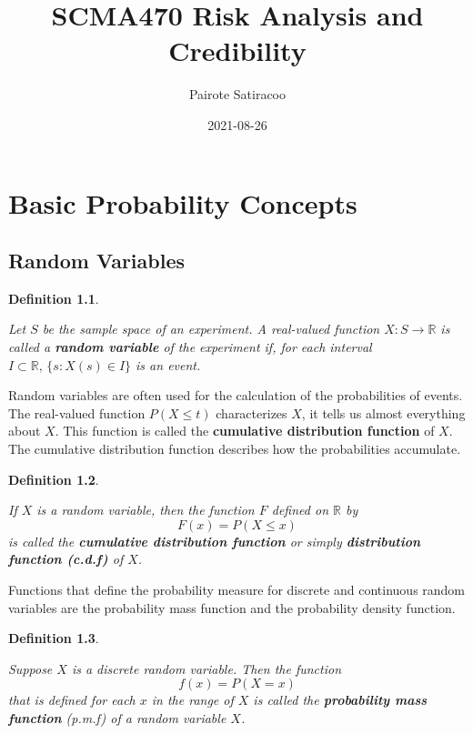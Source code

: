 \documentclass[
]{book}
\title{SCMA470 Risk Analysis and Credibility}
\author{Pairote Satiracoo}
\date{2021-08-26}
\theoremstyle{definition}
\newtheorem{definition}{Definition}[chapter]
\theoremstyle{definition}
\theoremstyle{definition}
\theoremstyle{definition}
\theoremstyle{remark}
\begin{document}
\maketitle

{
\setcounter{tocdepth}{1}
\tableofcontents
}
\hypertarget{basic-probability-concepts}{%
\chapter{Basic Probability Concepts}\label{basic-probability-concepts}}

\hypertarget{random-variables}{%
\section{Random Variables}\label{random-variables}}

\begin{definition}
\protect\hypertarget{def:unlabeled-div-1}{}\label{def:unlabeled-div-1}

\emph{Let \(S\) be the sample space of an experiment. A
real-valued function \(X : S \rightarrow \mathbb{R}\) is called a \textbf{random
variable} of the experiment if, for each interval
\(I \subset \mathbb{R}, \, \{s : X(s) \in I \}\) is an event. }

\end{definition}

Random variables are often used for the calculation of the probabilities
of events. The real-valued function \(P(X \le t)\) characterizes \(X\), it
tells us almost everything about \(X\). This function is called the
\textbf{cumulative distribution function} of \(X\). The cumulative distribution
function describes how the probabilities accumulate.

\begin{definition}
\protect\hypertarget{def:unlabeled-div-2}{}\label{def:unlabeled-div-2}

\emph{If \(X\) is a random variable, then the function \(F\)
defined on \(\mathbb{R}\) by \[F(x) = P(X \le x)\] is called the
\textbf{cumulative distribution function} or simply \textbf{distribution function
(c.d.f)} of \(X\).}

\end{definition}

Functions that define the probability measure for discrete and
continuous random variables are the probability mass function and the
probability density function.

\begin{definition}
\protect\hypertarget{def:unlabeled-div-3}{}\label{def:unlabeled-div-3}

\emph{Suppose \(X\) is a discrete random variable. Then the
function \[f(x) = P(X = x)\] that is defined for each \(x\) in the range
of \(X\) is called the \textbf{probability mass function} (p.m.f) of a random
variable \(X\).}

\end{definition}
\end{document}
